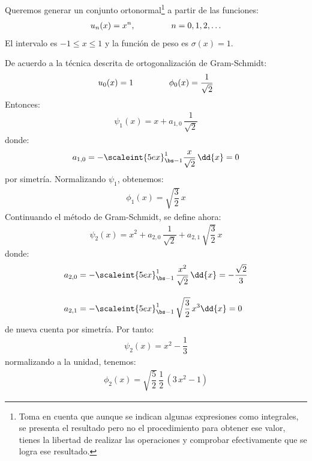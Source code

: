 Queremos generar un conjunto ortonormal\footnote{Toma en cuenta que aunque se indican algunas expresiones como integrales, se presenta el resultado pero no el procedimiento para obtener ese valor, tienes la libertad de realizar las operaciones y comprobar efectivamente que se logra ese resultado.} a partir de las funciones: 
\begin{align*}
u_{n}(x) = x^{n}, \hspace{1.5cm} n = 0, 1, 2, \ldots
\end{align*}
El intervalo es $-1 \leq x \leq 1$ y la función de peso es $\sigma (x) = 1$.
\par
De acuerdo a la técnica descrita de ortogonalización de Gram-Schmidt:
\begin{align}
u_{0} (x) = 1 \hspace{1.5cm} \phi_{0} (x) =  \dfrac{1}{\sqrt{2}}
\label{eq:ecuacion_10_50}
\end{align}
Entonces:
\begin{align}
\psi_{1}(x) = x + a_{1,0} \, \dfrac{1}{\sqrt{2}}
\label{eq:ecuacion_10_51}
\end{align}
donde:
\begin{align}
a_{1, 0} = - \scaleint{5ex}_{\bs -1}^{1} \dfrac{x}{\sqrt{2}} \, \dd{x} = 0
\label{eq:ecuacion_10_52}
\end{align}
por simetría. Normalizando $\psi_{1}$, obtenemos:
\begin{align}
\phi_{1}(x) = \sqrt{\dfrac{3}{2}} \, x
\label{eq:ecuacion_10_53}
\end{align}
Continuando el método de Gram-Schmidt, se define ahora:
\begin{align}
\psi_{2} (x) = x^{2} +  a_{2, 0} \, \dfrac{1}{\sqrt{2}} +  a_{2, 1} \, \sqrt{\dfrac{3}{2}} \, x
\label{eq:ecuacion_10_54}
\end{align}
donde:
\begin{align}
a_{2, 0} &= - \scaleint{5ex}_{\bs -1}^{1} \, \dfrac{x^{2}}{\sqrt{2}} \, \dd{x} = - \dfrac{\sqrt{2}}{3} \label{eq:ecuacion_10_55} \\[1em] 
a_{2, 1} &= - \scaleint{5ex}_{\bs -1}^{1} \, \sqrt{\dfrac{3}{2}} \, x^{3} \dd{x} = 0 \label{eq:ecuacion_10_56}
\end{align}
de nueva cuenta por simetría. Por tanto:
\begin{align}
\psi_{2}(x) = x^{2} - \dfrac{1}{3}
\label{eq:ecuacion_10_57}
\end{align}
normalizando a la unidad, tenemos:
\begin{align}
\phi_{2} (x) = \sqrt{\dfrac{5}{2}} \, \dfrac{1}{2} \, (3 \, x^{2} - 1)
\label{eq:ecuacion_10_58}
\end{align}
